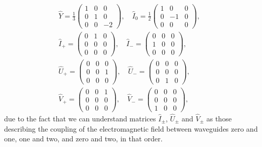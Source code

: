 \documentclass[9pt,twocolumn,twoside]{osajnl}
\begin{document}
\begin{eqnarray}
\hat{Y} = \frac{1}{3} \left( \begin{array}{ccc} 
1&0&0\\0&1&0\\0&0&-2    \end{array}\right), \quad
\hat{I}_{0} = \frac{1}{2} \left( \begin{array}{ccc} 1&0&0\\0&-1&0\\0&0&0 \end{array}\right), \quad  
\nonumber\\
\hat{I}_{+} = \left( \begin{array}{ccc} 0&1&0\\0&0&0\\0&0&0 \end{array}\right), \quad 
\hat{I}_{-} = \left( \begin{array}{ccc} 0&0&0\\1&0&0\\0&0&0 \end{array}\right), \quad \nonumber\\
\hat{U}_{+} = \left( \begin{array}{ccc} 0&0&0\\0&0&1\\0&0&0 \end{array}\right), \quad 
\hat{U}_{-} = \left( \begin{array}{ccc} 0&0&0\\0&0&0\\0&1&0 \end{array}\right), \quad \nonumber \\
\hat{V}_{+} = \left( \begin{array}{ccc} 0&0&1\\0&0&0\\0&0&0 \end{array}\right), \quad 
\hat{V}_{-} = \left( \begin{array}{ccc} 0&0&0\\0&0&0\\1&0&0 \end{array}\right), \label{eq:gens}
\end{eqnarray}
due to the fact that we can understand matrices $\hat{I}_{\pm}$, $\hat{U}_{\pm}$ and $\hat{V}_{\pm}$ as those describing the coupling of the electromagnetic field between waveguides zero and one, one and two, and zero and two, in that order.
\end{document}
